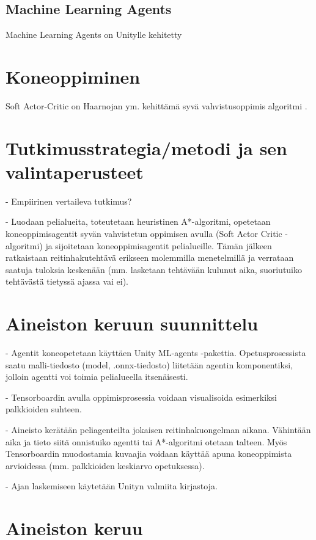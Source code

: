 \documentclass[utf8]{gradu3}
\begin{document}
\section{Machine Learning Agents}

Machine Learning Agents on Unitylle kehitetty 

\chapter{Koneoppiminen}

Soft Actor-Critic on Haarnojan ym. kehittämä syvä vahvistusoppimis algoritmi \parencite{haarnoja2018soft}. 

\chapter{Tutkimusstrategia/metodi ja sen valintaperusteet}

- Empiirinen vertaileva tutkimus?

- Luodaan pelialueita, toteutetaan heuristinen A*-algoritmi, opetetaan koneoppimisagentit syvän vahvistetun oppimisen avulla (Soft Actor Critic -algoritmi)
ja sijoitetaan koneoppimisagentit pelialueille. Tämän jälkeen ratkaistaan reitinhakutehtävä erikseen molemmilla menetelmillä ja verrataan saatuja tuloksia keskenään
(mm. lasketaan tehtävään kulunut aika, suoriutuiko tehtävästä tietyssä ajassa vai ei).

\chapter{Aineiston keruun suunnittelu}

- Agentit koneopetetaan käyttäen Unity ML-agents -pakettia. Opetusprosessista saatu malli-tiedosto (model, .onnx-tiedosto) liitetään agentin
komponentiksi, jolloin agentti voi toimia pelialueella itsenäisesti.

- Tensorboardin avulla oppimisprosessia voidaan visualisoida esimerkiksi palkkioiden suhteen.

- Aineisto kerätään peliagenteilta jokaisen reitinhakuongelman aikana. Vähintään aika ja tieto siitä onnistuiko agentti tai A*-algoritmi otetaan talteen.
Myös Tensorboardin muodostamia kuvaajia voidaan käyttää apuna koneoppimista arvioidessa (mm. palkkioiden keskiarvo opetuksessa).

- Ajan laskemiseen käytetään Unityn valmiita kirjastoja.

\chapter{Aineiston keruu}
\end{document}
